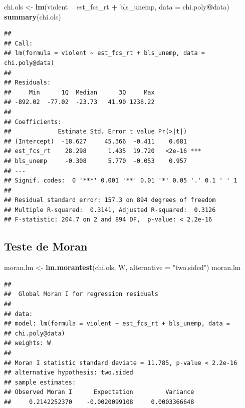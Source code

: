 \documentclass[12pt,]{article}
\newenvironment{Shaded}{\begin{snugshade}}{\end{snugshade}}
\newcommand{\KeywordTok}[1]{\textcolor[rgb]{0.13,0.29,0.53}{\textbf{#1}}}
\newcommand{\DataTypeTok}[1]{\textcolor[rgb]{0.13,0.29,0.53}{#1}}
\newcommand{\StringTok}[1]{\textcolor[rgb]{0.31,0.60,0.02}{#1}}
\newcommand{\OperatorTok}[1]{\textcolor[rgb]{0.81,0.36,0.00}{\textbf{#1}}}
\newcommand{\NormalTok}[1]{#1}
\begin{document}
\begin{Shaded}
\begin{Highlighting}[]
\NormalTok{chi.ols <-}\StringTok{ }\KeywordTok{lm}\NormalTok{(violent }\OperatorTok{~}\StringTok{ }\NormalTok{est_fcs_rt }\OperatorTok{+}\StringTok{ }\NormalTok{bls_unemp, }\DataTypeTok{data =}\NormalTok{ chi.poly}\OperatorTok{@}\NormalTok{data)}
\KeywordTok{summary}\NormalTok{(chi.ols)}
\end{Highlighting}
\end{Shaded}

\begin{verbatim}
## 
## Call:
## lm(formula = violent ~ est_fcs_rt + bls_unemp, data = chi.poly@data)
## 
## Residuals:
##     Min      1Q  Median      3Q     Max 
## -892.02  -77.02  -23.73   41.90 1238.22 
## 
## Coefficients:
##             Estimate Std. Error t value Pr(>|t|)    
## (Intercept)  -18.627     45.366  -0.411    0.681    
## est_fcs_rt    28.298      1.435  19.720   <2e-16 ***
## bls_unemp     -0.308      5.770  -0.053    0.957    
## ---
## Signif. codes:  0 '***' 0.001 '**' 0.01 '*' 0.05 '.' 0.1 ' ' 1
## 
## Residual standard error: 157.3 on 894 degrees of freedom
## Multiple R-squared:  0.3141, Adjusted R-squared:  0.3126 
## F-statistic: 204.7 on 2 and 894 DF,  p-value: < 2.2e-16
\end{verbatim}

\subsection{Teste de Moran}\label{teste-de-moran}

\begin{Shaded}
\begin{Highlighting}[]
\NormalTok{moran.lm <-}\StringTok{ }\KeywordTok{lm.morantest}\NormalTok{(chi.ols, W, }\DataTypeTok{alternative =} \StringTok{"two.sided"}\NormalTok{)}
\NormalTok{moran.lm}
\end{Highlighting}
\end{Shaded}

\begin{verbatim}
## 
##  Global Moran I for regression residuals
## 
## data:  
## model: lm(formula = violent ~ est_fcs_rt + bls_unemp, data =
## chi.poly@data)
## weights: W
## 
## Moran I statistic standard deviate = 11.785, p-value < 2.2e-16
## alternative hypothesis: two.sided
## sample estimates:
## Observed Moran I      Expectation         Variance 
##     0.2142252370    -0.0020099108     0.0003366648
\end{verbatim}
\end{document}
